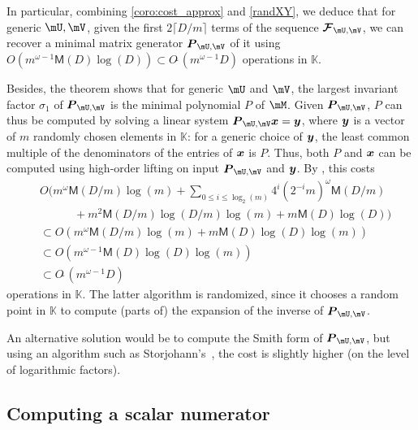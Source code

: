 \documentclass[12pt]{article}
\newcommand{\mat}[1]{\bm{\MakeUppercase{#1}}} %
\newcommand{\col}[1]{\bm{\MakeLowercase{#1}}} %
\newcommand{\seq}{\mat{\mathcal{F}}} %
\newcommand{\softO}[1]{O{\tilde{~}}(#1)} %
\newcommand{\minpoly}{P}
\def\M {\ensuremath{\mathsf{M}}}
\def\K{\mathbb{K}}
\def\K {\ensuremath{\mathbb{K}}}
\begin{document}
In particular, combining \cref{coro:cost_approx} and \cref{randXY}, we
deduce that for generic $\mU,\mV$, given the first $2 \lceil D/m
\rceil$ terms of the sequence $\seq_{\mU,\mV}$, we can recover a
minimal matrix generator  $\mat{P}_{\mU,\mV}$ of it using $O(m^{\omega-1} \M(D) \log(D))
\subset \softO{m^{\omega-1} D}$ operations in $\K$.

Besides, the theorem shows that for generic $\mU$ and $\mV$, the
largest invariant factor $\sigma_1$ of $\mat{P}_{\mU,\mV}$ is the
minimal polynomial $\minpoly$ of $\mM$.  Given $\mat{P}_{\mU,\mV}$,
$\minpoly$ can thus be computed by solving a linear system
$\mat{P}_{\mU,\mV} \col{x} = \col{y}$, where $\col{y}$ is a vector of
$m$ randomly chosen elements in $\K$: for a generic choice of
$\col{y}$, the least common multiple of the denominators of the
entries of $\col{x}$ is $\minpoly$.  Thus, both $\minpoly$ and $\col{x}$
can be computed using
high-order lifting \cite[Algorithm~5]{Stor03} on input
$\mat{P}_{\mU,\mV}$ and $\col{y}$. By
\cite[Corollary~16]{Stor03}, this costs
\begin{align}
  & O\Bigg(m^{\omega} \M(D/m) \log(m) + \sum_{0 \le i \le \log_2(m)} 4^i (2^{-i}m)^\omega \M(D/m) \nonumber \\
  & \quad\qquad + m^2 \M(D/m)\log(D/m)\log(m) + m \M(D) \log(D) \Bigg) \nonumber \\
  & \subset O(m^\omega \M(D/m) \log(m) + m \M(D)\log(D)\log(m))  \nonumber \\
  & \subset O(m^{\omega-1} \M(D) \log(D)\log(m))  \label{eqn:hol_cost}\\
  & \subset \softO{m^{\omega-1}D} \nonumber
\end{align}
operations in $\K$.
The latter algorithm is randomized, since it chooses a random point in $\K$ to
compute (parts of) the expansion of the inverse of
$\mat{P}_{\mU,\mV}$.


An alternative solution would be to compute the Smith form of
$\mat{P}_{\mU,\mV}$, but using an algorithm such as
Storjohann's~\cite[Section~17]{Stor03}, the cost is slightly higher (on the
level of logarithmic factors).


\subsection{Computing a scalar numerator}\label{ssec:scalar_numer}
\end{document}

